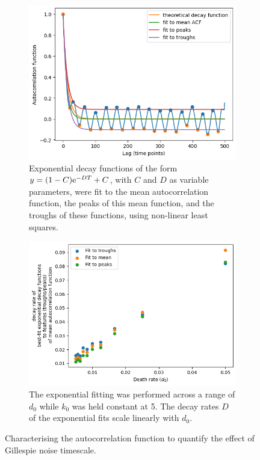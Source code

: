 \begin{figure}
  \centering
  \begin{subfigure}[t]{0.45\textwidth}
  \centering
    \includegraphics[width=\linewidth]{acf_fit_example.png}
    \caption{
      Exponential decay functions of the form $y = (1-C)\mathrm{e}^{-DT}+C$, with $C$ and $D$ as variable parameters, were fit to the mean autocorrelation function, the peaks of this mean function, and the troughs of these functions, using non-linear least squares.
    }
    \label{fig:acf-noisetimescale-effect-fit}
  \end{subfigure}%
  \begin{subfigure}[t]{0.45\textwidth}
  \centering
    \includegraphics[width=\linewidth]{deathrate_vs_decay.png}
    \caption{
      The exponential fitting was performed across a range of $d_{0}$ while $k_{0}$ was held constant at 5.
      The decay rates $D$ of the exponential fits scale linearly with $d_{0}$.
    }
    \label{fig:acf-noisetimescale-effect-relationship}
  \end{subfigure}

  \caption{
    Characterising the autocorrelation function to quantify the effect of Gillespie noise timescale.
  }
  \label{fig:acf-noisetimescale-effect}
\end{figure}

